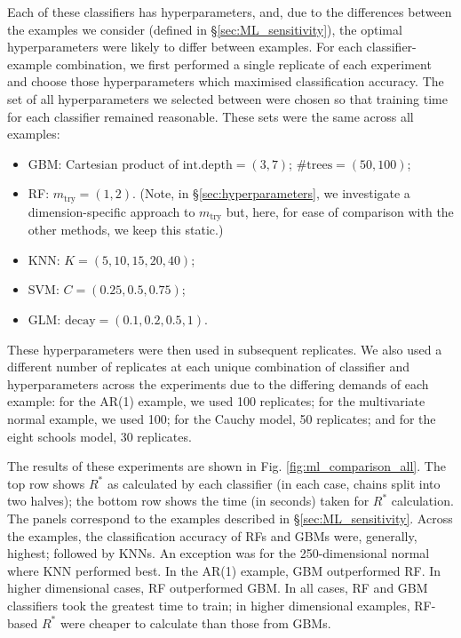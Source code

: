 \documentclass[ba]{imsart}
\numberwithin{equation}{section}
\theoremstyle{plain}
\begin{document}
\begin{supplement}
		Each of these classifiers has hyperparameters, and, due to the differences between the examples we consider (defined in \S\ref{sec:ML_sensitivity}), the optimal hyperparameters were likely to differ between examples. For each classifier-example combination, we first performed a single replicate of each experiment and choose those hyperparameters which maximised classification accuracy. The set of all hyperparameters we selected between were chosen so that training time for each classifier remained reasonable. These sets were the same across all examples:
		
		\begin{itemize}
			\item GBM: Cartesian product of $\text{int.depth}=(3, 7)$; $\text{\# trees} = (50, 100)$;
			\item RF: $m_{\text{try}} = (1, 2)$. (Note, in \S\ref{sec:hyperparameters}, we investigate a dimension-specific approach to $m_{\text{try}}$ but, here, for ease of comparison with the other methods, we keep this static.)
			\item KNN: $K=(5,10,15, 20,40)$;
			\item SVM: $C=(0.25, 0.5, 0.75)$;
			\item GLM: $\text{decay}=(0.1, 0.2, 0.5, 1)$.
		\end{itemize}
		
		These hyperparameters were then used in subsequent replicates. We also used a different number of replicates at each unique combination of classifier and hyperparameters across the experiments due to the differing demands of each example: for the AR(1) example, we used 100 replicates; for the multivariate normal example, we used 100; for the Cauchy model, 50 replicates; and for the eight schools model, 30 replicates.
		
		The results of these experiments are shown in Fig. \ref{fig:ml_comparison_all}. The top row shows $R^*$ as calculated by each classifier (in each case, chains split into two halves); the bottom row shows the time (in seconds) taken for $R^*$ calculation. The panels correspond to the examples described in \S\ref{sec:ML_sensitivity}. Across the examples, the classification accuracy of RFs and GBMs were, generally, highest; followed by KNNs. An exception was for the 250-dimensional normal where KNN performed best. In the AR(1) example, GBM outperformed RF. In higher dimensional cases, RF outperformed GBM. In all cases, RF and GBM classifiers took the greatest time to train; in higher dimensional examples, RF-based $R^*$ were cheaper to calculate than those from GBMs.
		

\end{supplement}
\end{document}
